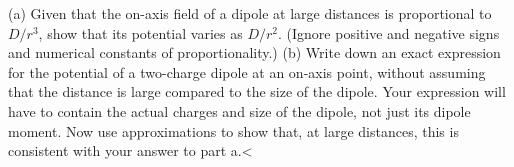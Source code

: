         (a) Given that the on-axis field of a dipole at large distances is proportional to
        $D/r^3$, show that its potential
        varies as $D/r^2$. (Ignore positive and negative signs and
        numerical constants of proportion\-ality.)\hwendpart
        (b) Write down an exact expression for the potential of a two-charge dipole at an on-axis point,
        without assuming that the distance is large compared to the size
        of the dipole. Your expression will have to contain the actual
        charges and size of the dipole, not just its dipole moment. Now
        use approximations to show that, at large distances, this is consistent with
        your answer to part a.<%
